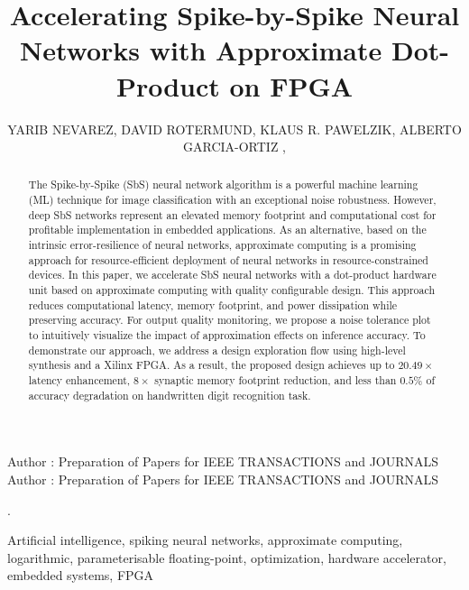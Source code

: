 \title {Accelerating Spike-by-Spike Neural Networks with Approximate Dot-Product on FPGA}

\author{
	\uppercase{Yarib Nevarez},	
	\uppercase{David Rotermund},
	\uppercase{Klaus R. Pawelzik},
	\uppercase{Alberto Garcia-Ortiz} ,
}

\address[1]{Institute of Electrodynamics and Microelectronics, University of Bremen, Bremen 28359, Germany (e-mail: nevarez@item.uni-bremen.de)}

\address[2]{Institute for Theoretical Physics, University of Bremen, Bremen 28359, Germany (e-mail: davrot@@neuro.uni-bremen.de)}

\address[3]{Institute for Theoretical Physics, University of Bremen, Bremen 28359, Germany (e-mail: pawelzik@@neuro.uni-bremen.de)}

\address[4]{Institute of Electrodynamics and Microelectronics, University of Bremen, Bremen 28359, Germany (e-mail: agaracia@item.uni-bremen.de)}


\markboth
{Author \headeretal: Preparation of Papers for IEEE TRANSACTIONS and JOURNALS}
{Author \headeretal: Preparation of Papers for IEEE TRANSACTIONS and JOURNALS}

.

\begin{abstract}
The Spike-by-Spike (SbS) neural network algorithm is a powerful machine learning (ML) technique for image classification with an exceptional noise robustness. However, deep SbS networks represent an elevated memory footprint and computational cost for profitable implementation in embedded applications. As an alternative, based on the intrinsic error-resilience of neural networks, approximate computing is a promising approach for resource-efficient deployment of neural networks in resource-constrained devices. In this paper, we accelerate SbS neural networks with a dot-product hardware unit based on approximate computing with quality configurable design. This approach reduces computational latency, memory footprint, and power dissipation while preserving accuracy. For output quality monitoring, we propose a noise tolerance plot to intuitively visualize the impact of approximation effects on inference accuracy. To demonstrate our approach, we address a design exploration flow using high-level synthesis and a Xilinx FPGA. As a result, the proposed design achieves up to $20.49\times$ latency enhancement, $8\times$ synaptic memory footprint reduction, and less than $0.5\%$ of accuracy degradation on handwritten digit recognition task.
	
\end{abstract}

\begin{keywords}
Artificial intelligence, spiking neural networks, approximate computing, logarithmic, parameterisable floating-point, optimization, hardware accelerator, embedded systems, FPGA
\end{keywords}

\titlepgskip=-15pt

\maketitle

